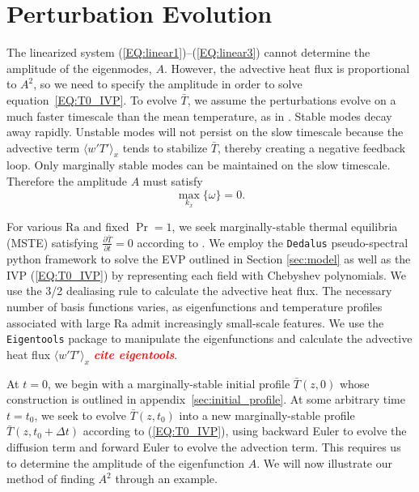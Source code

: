 \documentclass[reprint,amsmath,amssymb,aps]{revtex4-1}
\newcommand{\note}[1]{\noindent \textbf{\textit{\textcolor{Red}{#1}}}}
\newcommand\Ra{\mathrm{Ra}}
\newcommand{\eq}[1]{(\ref{#1})}
\newcommand{\eqss}[2]{(\ref{#1})--(\ref{#2})}
\begin{document}
\section{Perturbation Evolution}\label{sec:evolution}
The linearized system \eqss{EQ:linear1}{EQ:linear3} cannot determine the amplitude of the eigenmodes, $A$.
However, the advective heat flux is proportional to $A^2$, so we need to specify the amplitude in order to solve equation~\ref{EQ:T0_IVP}.
To evolve $\bar{T}$, we assume the perturbations evolve on a much faster timescale than the mean temperature, as in \cite{michel_chini_2019}.
Stable modes decay away rapidly. 
Unstable modes will not persist on the slow timescale because the advective term $\langle w'T' \rangle_x$ tends to stabilize $\bar{T}$, thereby creating a negative feedback loop.
Only marginally stable modes can be maintained on the slow timescale.
Therefore the amplitude $A$ must satisfy
\begin{equation}
    \max_{k_x} \{ \omega \} = 0.
\end{equation}

For various $\Ra$ and fixed $\Pr = 1$, we seek marginally-stable thermal equilibria (MSTE) satisfying $\frac{\partial \bar{T}}{\partial t} = 0$ according to . 
We employ the \texttt{Dedalus} pseudo-spectral python framework \cite{Dedalus_2020} to solve the EVP outlined in Section \ref{sec:model} as well as the IVP \eq{EQ:T0_IVP} by representing each field with Chebyshev polynomials.
We use the 3/2 dealiasing rule to calculate the advective heat flux.
The necessary number of basis functions varies, as eigenfunctions and temperature profiles associated with large $\Ra$ admit increasingly small-scale features. 
We use the \texttt{Eigentools} package to manipulate the eigenfunctions and calculate the advective heat flux $\langle w' T' \rangle_x$ \note{cite eigentools}.

At $t = 0$, we begin with a marginally-stable initial profile $\bar{T}(z, 0)$ whose construction is outlined in appendix~\ref{sec:initial_profile}. 
At some arbitrary time $t = t_0$, we seek to evolve $\bar{T}(z, t_0)$ into a new marginally-stable profile $\bar{T}(z, t_0 + \Delta t)$ according to \eq{EQ:T0_IVP}, using backward Euler to evolve the diffusion term and forward Euler to evolve the advection term. 
This requires us to determine the amplitude of the eigenfunction $A$.
We will now illustrate our method of finding $A^2$ through an example.
\end{document}

